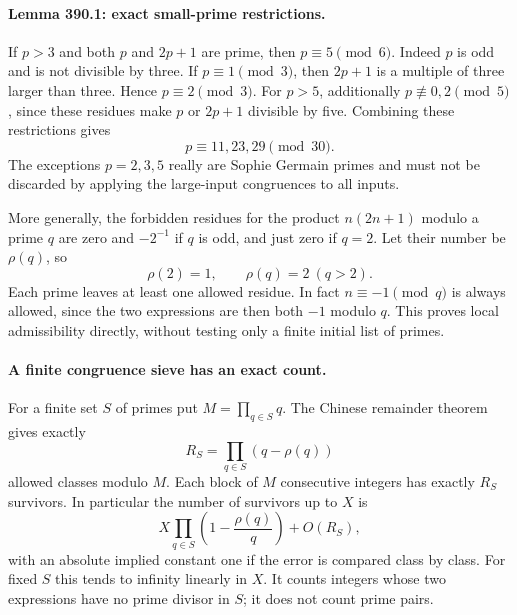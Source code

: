 \documentclass[11pt]{article}
\begin{document}
\paragraph{Lemma 390.1: exact small-prime restrictions.}
If $p>3$ and both $p$ and $2p+1$ are prime, then $p\equiv5\pmod6$. Indeed $p$ is odd and is not divisible by three. If $p\equiv1\pmod3$, then $2p+1$ is a multiple of three larger than three. Hence $p\equiv2\pmod3$. For $p>5$, additionally $p\not\equiv0,2\pmod5$, since these residues make $p$ or $2p+1$ divisible by five. Combining these restrictions gives
\begin{equation}\label{a390:thirty}
                         p\equiv11,23,29\pmod{30}.
\end{equation}
The exceptions $p=2,3,5$ really are Sophie Germain primes and must not be discarded by applying the large-input congruences to all inputs.

More generally, the forbidden residues for the product $n(2n+1)$ modulo a prime $q$ are zero and $-2^{-1}$ if $q$ is odd, and just zero if $q=2$. Let their number be $\rho(q)$, so
\[
                       \rho(2)=1,\qquad \rho(q)=2\ (q>2).
\]
Each prime leaves at least one allowed residue. In fact $n\equiv-1\pmod q$ is always allowed, since the two expressions are then both $-1$ modulo $q$. This proves local admissibility directly, without testing only a finite initial list of primes.

\paragraph{A finite congruence sieve has an exact count.}
For a finite set $S$ of primes put $M=\prod_{q\in S}q$. The Chinese remainder theorem gives exactly
\begin{equation}\label{a390:classes}
                       R_S=\prod_{q\in S}(q-\rho(q))
\end{equation}
allowed classes modulo $M$. Each block of $M$ consecutive integers has exactly $R_S$ survivors. In particular the number of survivors up to $X$ is
\[
                  X\prod_{q\in S}\left(1-\frac{\rho(q)}q\right)
                         +O(R_S),
\]
with an absolute implied constant one if the error is compared class by class. For fixed $S$ this tends to infinity linearly in $X$. It counts integers whose two expressions have no prime divisor in $S$; it does not count prime pairs.
\end{document}
